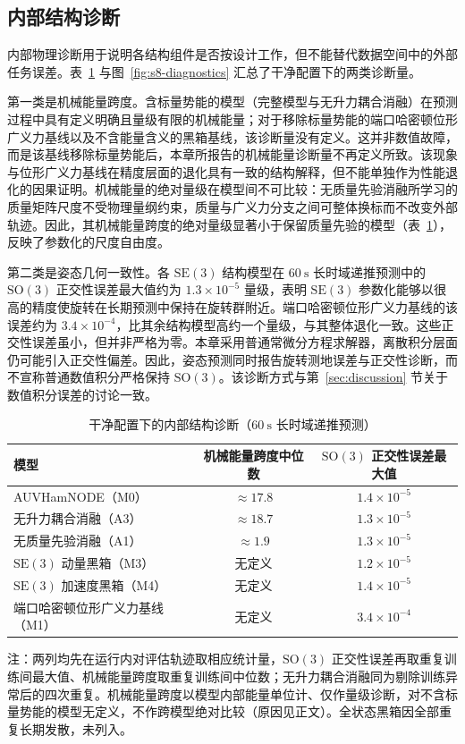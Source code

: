 \documentclass[UTF8,zihao=-4]{ctexrep}
\newcommand{\SO}{\mathrm{SO}}
\newcommand{\SE}{\mathrm{SE}}
\begin{document}
\subsection{内部结构诊断}

内部物理诊断用于说明各结构组件是否按设计工作，但不能替代数据空间中的外部任务误差。表~\ref{tab:s8-diag} 与图~\ref{fig:s8-diagnostics} 汇总了干净配置下的两类诊断量。

第一类是机械能量跨度。含标量势能的模型（完整模型与无升力耦合消融）在预测过程中具有定义明确且量级有限的机械能量；对于移除标量势能的端口哈密顿位形广义力基线以及不含能量含义的黑箱基线，该诊断量没有定义。这并非数值故障，而是该基线移除标量势能后，本章所报告的机械能量诊断量不再定义所致。该现象与位形广义力基线在精度层面的退化具有一致的结构解释，但不能单独作为性能退化的因果证明。机械能量的绝对量级在模型间不可比较：无质量先验消融所学习的质量矩阵尺度不受物理量纲约束，质量与广义力分支之间可整体换标而不改变外部轨迹。因此，其机械能量跨度的绝对量级显著小于保留质量先验的模型（表~\ref{tab:s8-diag}），反映了参数化的尺度自由度。

第二类是姿态几何一致性。各 \(\SE(3)\) 结构模型在 \(60~\mathrm{s}\) 长时域递推预测中的 \(\SO(3)\) 正交性误差最大值约为 \(1.3\times10^{-5}\) 量级，表明 \(\SE(3)\) 参数化能够以很高的精度使旋转在长期预测中保持在旋转群附近。端口哈密顿位形广义力基线的该误差约为 \(3.4\times10^{-4}\)，比其余结构模型高约一个量级，与其整体退化一致。这些正交性误差虽小，但并非严格为零。本章采用普通常微分方程求解器，离散积分层面仍可能引入正交性偏差。因此，姿态预测同时报告旋转测地误差与正交性诊断，而不宣称普通数值积分严格保持 \(\SO(3)\)。该诊断方式与第~\ref{sec:discussion} 节关于数值积分误差的讨论一致。

\begin{table}[htbp]
  \centering
  \caption{干净配置下的内部结构诊断（\(60~\mathrm{s}\) 长时域递推预测）}
  \label{tab:s8-diag}
  \small
  \begin{tabularx}{\textwidth}{>{\raggedright\arraybackslash}Xcc}
    \toprule
    模型 & 机械能量跨度中位数 & \(\SO(3)\) 正交性误差最大值 \\
    \midrule
    AUVHamNODE（M0）& \(\approx 17.8\) & \(1.4\times10^{-5}\) \\
    无升力耦合消融（A3）& \(\approx 18.7\) & \(1.3\times10^{-5}\) \\
    无质量先验消融（A1）& \(\approx 1.9\) & \(1.3\times10^{-5}\) \\
    \(\SE(3)\) 动量黑箱（M3）& 无定义 & \(1.2\times10^{-5}\) \\
    \(\SE(3)\) 加速度黑箱（M4）& 无定义 & \(1.4\times10^{-5}\) \\
    端口哈密顿位形广义力基线（M1）& 无定义 & \(3.4\times10^{-4}\) \\
    \bottomrule
  \end{tabularx}
  \par\vspace{2pt}
  \footnotesize 注：两列均先在运行内对评估轨迹取相应统计量，\(\SO(3)\) 正交性误差再取重复训练间最大值、机械能量跨度取重复训练间中位数；无升力耦合消融同为剔除训练异常后的四次重复。机械能量跨度以模型内部能量单位计、仅作量级诊断，对不含标量势能的模型无定义，不作跨模型绝对比较（原因见正文）。全状态黑箱因全部重复长期发散，未列入。
\end{table}
\end{document}
